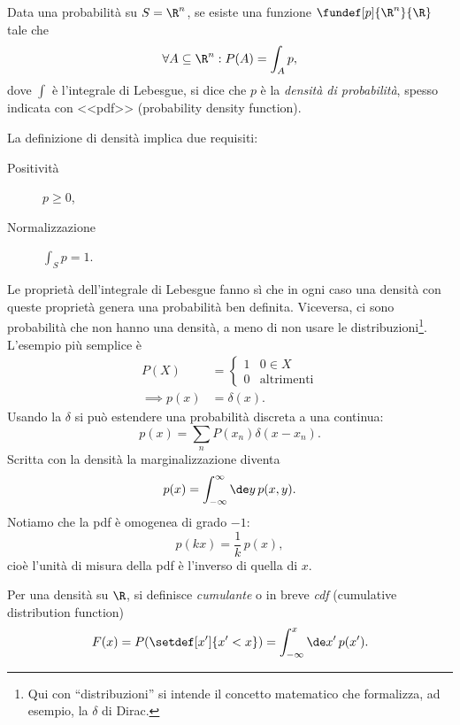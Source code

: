 \begin{definition}
	Data una probabilità su $S=\R^n$, se esiste una funzione $\fundef[p]{\R^n}{\R}$ tale che
	\begin{equation*}
		\forall A\subseteq\R^n : P(A) = \int_A p,
	\end{equation*}
	dove $\int$ è l'integrale di Lebesgue,
	si dice che $p$ è la \emph{densità di probabilità},
	spesso indicata con <<pdf>> (probability density function).
\end{definition}

La definizione di densità implica due requisiti:
\begin{description}
	\item[Positività] $p \ge 0$,
	\item[Normalizzazione] $\int_S p = 1$.
\end{description}
Le proprietà dell'integrale di Lebesgue fanno sì che in ogni caso una densità con queste proprietà genera una probabilità ben definita.
Viceversa, ci sono probabilità che non hanno una densità, a meno di non usare le distribuzioni\footnote{Qui con ``distribuzioni'' si intende il concetto matematico che formalizza, ad esempio, la $\delta$ di Dirac.}.
L'esempio più semplice è
\begin{align*}
	P(X) &= \begin{cases}
		1 & 0 \in X \\
		0 & \text{altrimenti}
	\end{cases} \\
	\implies p(x) &= \delta(x).
\end{align*}
Usando la $\delta$ si può estendere una probabilità discreta a una continua:
\begin{equation*}
	p(x) = \sum_n P(x_n)\delta(x-x_n).
\end{equation*}
Scritta con la densità la marginalizzazione diventa
\begin{equation*}
	p(x) = \int_{-\infty}^\infty \de y\,p(x,y).
\end{equation*}
Notiamo che la pdf è omogenea di grado $-1$:
\begin{equation*}
	p(kx) = \frac1k\, p(x),
\end{equation*}
cioè l'unità di misura della pdf è l'inverso di quella di $x$.

\begin{definition}[Cumulante]
	Per una densità su $\R$, si definisce \emph{cumulante} o in breve \emph{cdf} (cumulative distribution function)
	\begin{equation*}
		F(x) = P(\setdef[x']{x'<x}) = \int_{-\infty}^x \de x'\,p(x').
	\end{equation*}
\end{definition}

